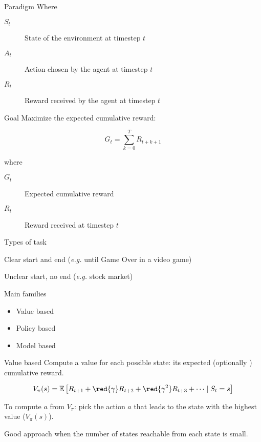 \begin{frame}{Paradigm}
  Where

  \begin{description}
    \item[$S_t$] State of the environment at timestep $t$
    \item[$A_t$] Action chosen by the agent at timestep $t$
    \item[$R_t$] Reward received by the agent at timestep $t$
  \end{description}
\end{frame}

\begin{frame}{Goal}
  Maximize the expected cumulative reward:

  \[
    G_t = \sum_{k=0}^T R_{t+k+1}
  \]

  where

  \begin{description}
    \item[$G_t$] Expected cumulative reward
    \item[$R_t$] Reward received at timestep $t$
  \end{description}
\end{frame}

\begin{frame}{Types of task}
  \begin{description}[<+->]
    \item[Episodic] Clear start and end (\textit{e.g.} until Game Over in a video game)
    \item[Continuous] Unclear start, no end (\textit{e.g.} stock market)
  \end{description}
\end{frame}

\begin{frame}{Main families}
  \begin{itemize}
    \item Value based
    \item Policy based
    \item Model based
  \end{itemize}
\end{frame}

\begin{frame}{Value based}
  Compute a value for each possible state: its expected (optionally ) cumulative reward.

  \[
    V_\pi(s) = \mathbb{E}\left[
      R_{t + 1}
      + \red{\gamma} R_{t + 2}
      + \red{\gamma^2} R_{t + 3}
      + \dots
      \mid S_t = s
    \right]
  \]

  \pause

  To compute $a$ from $V_\pi$: pick the action $a$ that leads to the state with the highest value ($V_\pi(s)$).

  \pause

  Good approach when the number of states reachable from each state is small.
\end{frame}

